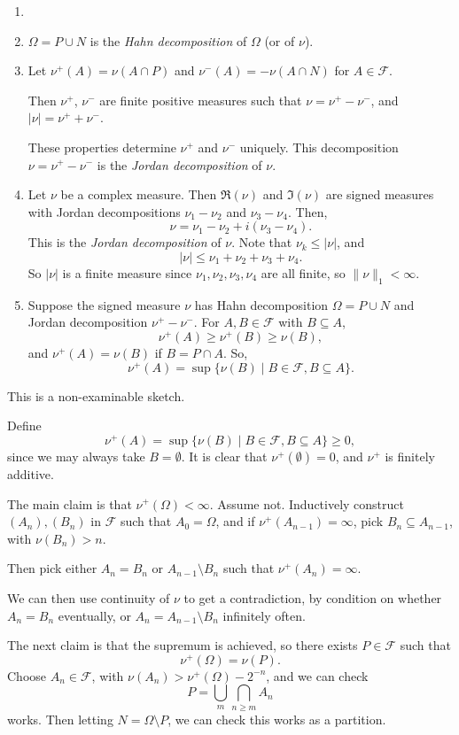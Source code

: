\documentclass[12pt]{article}
\begin{document}
\begin{remark}
	\begin{enumerate}
		\item[]
		\item $\Omega = P \cup N$ is the \emph{Hahn decomposition} of $\Omega$ (or of $\nu$).
		\item Let $\nu^+(A) = \nu(A \cap P)$ and $\nu^-(A) = - \nu(A \cap N)$ for $A \in \mathcal{F}$.

			Then $\nu^+$, $\nu^-$ are finite positive measures such that $\nu = \nu^+ - \nu^-$, and $|\nu| = \nu^+ + \nu^-$.

			These properties determine $\nu^+$ and $\nu^-$ uniquely. This decomposition $\nu = \nu^+ - \nu^-$ is the \emph{Jordan decomposition} of $\nu$.
		\item Let $\nu$ be a complex measure. Then $\Re (\nu)$ and $\Im(\nu)$ are signed measures with Jordan decompositions $\nu_1 - \nu_2$ and $\nu_3 - \nu_4$. Then,
			\[
			\nu = \nu_1 - \nu_2 + i(\nu_3 - \nu_4).
			\]
			This is the \emph{Jordan decomposition} of $\nu$. Note that $\nu_k \leq |\nu|$, and
			\[
			|\nu| \leq \nu_1 + \nu_2 + \nu_3 + \nu_4.
			\]
			So $|\nu|$ is a finite measure since $\nu_1, \nu_2, \nu_3, \nu_4$ are all finite, so $\|\nu\|_1 < \infty$.
		\item Suppose the signed measure $\nu$ has Hahn decomposition $\Omega = P \cup N$ and Jordan decomposition $\nu^+ - \nu^-$. For $A, B \in \mathcal{F}$ with $B \subseteq A$,
			\[
			\nu^+(A) \geq \nu^+(B) \geq \nu(B),
			\]
			and $\nu^+(A) = \nu(B)$ if $B = P \cap A$. So,
			\[
				\nu^+(A) = \sup \{ \nu(B) \mid B \in \mathcal{F}, B \subseteq A\}.
			\]
	\end{enumerate}
\end{remark}

\begin{proofbox}
	This is a non-examinable sketch.

	Define
	\[
		\nu^+(A) = \sup \{\nu(B) \mid B \in \mathcal{F}, B \subseteq A\} \geq 0,
	\]
	since we may always take $B = \emptyset$. It is clear that $\nu^+(\emptyset) = 0$, and $\nu^+$ is finitely additive.

	The main claim is that $\nu^+(\Omega) < \infty$. Assume not. Inductively construct $(A_n), (B_n)$ in $\mathcal{F}$ such that $A_0 = \Omega$, and if $\nu^+(A_{n-1}) = \infty$, pick $B_n \subseteq A_{n-1}$, with $\nu(B_n) > n$.

	Then pick either $A_n = B_n$ or $A_{n-1} \setminus B_n$ such that $\nu^+(A_n) = \infty$.

	We can then use continuity of $\nu$ to get a contradiction, by condition on whether $A_n = B_n$ eventually, or $A_n = A_{n-1} \setminus B_n$ infinitely often.

	The next claim is that the supremum is achieved, so there exists $P \in \mathcal{F}$ such that
	\[
		\nu^+(\Omega) = \nu(P).
	\]
	Choose $A_n \in \mathcal{F}$, with $\nu(A_n) > \nu^+(\Omega) - 2^{-n}$, and we can check
	\[
	P = \bigcup_m \bigcap_{n \geq m} A_n
	\]
	works. Then letting $N = \Omega \setminus P$, we can check this works as a partition.
\end{proofbox}
\end{document}

